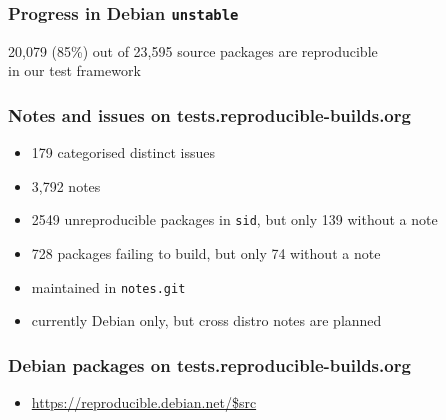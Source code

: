 \documentclass[14pt]{beamer}
\begin{document}
\begin{frame}
 \frametitle{Progress in Debian \texttt{unstable}}
 \begin{center}
  \footnotesize{20,079 (85\%) out of 23,595 source packages are reproducible \\
    in our test framework}
  \vfill
 \end{center}
\end{frame}

\begin{frame}
 \frametitle{Notes and issues on tests.reproducible-builds.org}

 \begin{itemize}
  \item { 179 categorised distinct issues }
  \item { 3,792 notes }
  \item<2-4> { 2549 unreproducible packages in \texttt{sid}, but only 139 without a 
  note }
  \item<2-4> { 728 packages failing to build, but only 74 without a note }
  \item<3-4> { maintained in \texttt{notes.git} }
  \item<4> { currently Debian only, but cross distro notes are planned}
 \end{itemize}
\end{frame}



\begin{frame}
 \frametitle{Debian packages on tests.reproducible-builds.org}
 \begin{itemize}
  \item \url {https://reproducible.debian.net/$src}
 \end{itemize}
\end{frame}
\end{document}
